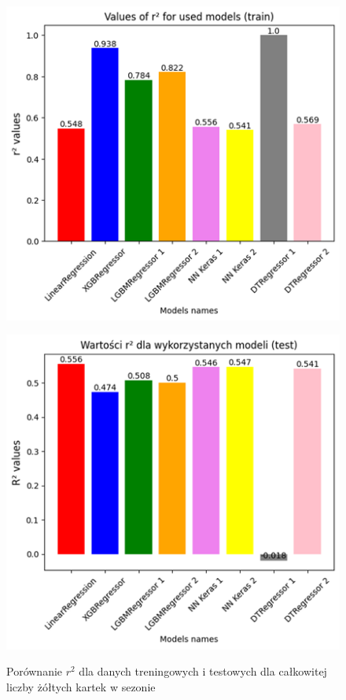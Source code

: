 \documentclass{article}
\begin{document}
\begin{figure}[H]
  \centering
  \begin{minipage}[b]{0.5\textwidth}
    \centering
    \includegraphics[width=\textwidth]{all_r2_3.png}
    \label{fig:all_r2_train2}
  \end{minipage}%
  \begin{minipage}[b]{0.5\textwidth}
    \centering
    \includegraphics[width=\textwidth]{all_r2_4.png}
    \label{fig:all_r2_test2}
  \end{minipage}
  \captionsetup{justification=centering}
  \caption{Porównanie $r^2$ dla danych treningowych i testowych dla całkowitej liczby żółtych kartek w sezonie}
  \label{fig:all_r2_2}
\end{figure}
\end{document}
